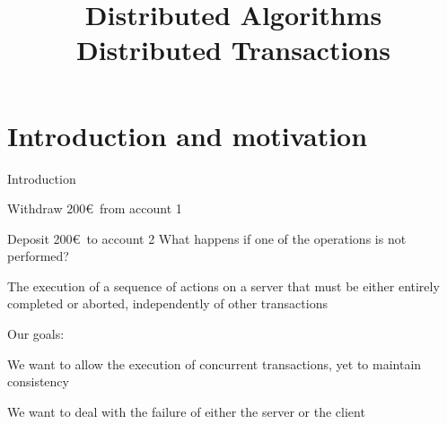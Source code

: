 
\title[DS - Distributed Transactions]{\textbf{Distributed Algorithms}\\Distributed Transactions}

\graphicspath{{figs/13/}}



\newcommand{\TStart}{\textsc{tstart}}
\newcommand{\CKnow}{C_{\mathit{know}}}
\newcommand{\Transaction}{\mathit{transaction}}
\newcommand{\Decision}{\mathit{decision}}
\newcommand{\Participants}{\mathit{participants}}
\newcommand{\Vote}{\mathit{vote}}
\newcommand{\YES}{\textsc{yes}}
\newcommand{\NO}{\textsc{no}}
\newcommand{\VOTEREQUEST}{\textsc{voterequest}}
\newcommand{\VOTE}{\textsc{vote}}
\newcommand{\DECIDE}{\textsc{decide}}
\newcommand{\Now}{\textsf{now}}





\FrameTitle{}
\FrameContent




\section{Introduction and motivation}

\begin{frame}{Introduction}
\begin{example}
\BI
\item Withdraw 200\euro\ from account 1
\item Deposit 200\euro\ to account 2
\EI
What happens if one of the operations is not performed?
\end{example}

\begin{definition}[Transaction]
The execution of a sequence of actions on a server that must be either
entirely completed or aborted, independently of other transactions
\end{definition}

Our goals:
\BI
\item We want to allow the execution of concurrent transactions, yet to
maintain consistency
\item We want to deal with the failure of either the server or the client
\EI

\end{frame}

